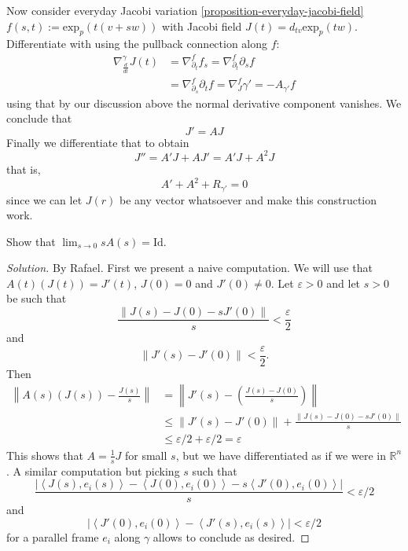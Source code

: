 Now consider everyday Jacobi variation
\ref{proposition-everyday-jacobi-field}
 $f(s,t):=\text{exp}_p(t(v+sw))$ with Jacobi
 field
$J(t)=d_{tv}\text{exp}_p(tw)$. Differentiate
with using the pullback connection
along $f$:
$$
\begin{aligned}
\nabla_{\frac{d}{dt}}^\gamma
J(t)&=\nabla_{\partial_t}^ff_s=
\nabla_{\partial_t}^f
\partial_sf\\
&=\nabla_{\partial_s}^f \partial_t
f=\nabla_{J}^f \gamma' = -A_{\gamma'}f
\end{aligned}
$$
using that by our discussion above the normal
derivative component vanishes. We
conclude that
\begin{equation}
\label{equation-jacob-field-deriv-shape}
J'=AJ
\end{equation}
Finally we differentiate that to obtain
$$
J''=A'J+AJ'=A'J+A^2J
$$
that is,
\begin{equation}
\label{equation-Riccati}
A'+A^2+R_{\gamma'}=0
\end{equation}
since we can let $J(r)$ be any vector
whatsoever and make this construction
work.
\begin{exercise}
\label{exercise-limit-of-shape-operator}
Show that $\lim_{s\to0}sA(s)=\text{Id}$.
\end{exercise}

\begin{proof}[Solution]
By Rafael. First we present a naive
computation. We will use that
$A(t)(J(t))=J'(t)$,  $J(0)=0$ and $J'(0)\neq
0$. Let $\varepsilon>0$ and let
$s>0$ be such that
$$
\frac{\|J(s)-J(0)-sJ'(0)\|}{s}
<\frac{\varepsilon}{2}
$$
and
$$
\|J'(s)-J'(0)\|<\frac{\varepsilon}{2}.
$$
Then
$$
\begin{aligned}
\left\|A(s)(J(s))-\frac{J(s)}{s}\right\|&
=\left\|J'(s)-\left(\frac{J(s)-J(0)}{s}
\right)\right\|\\
&\leq
\|J'(s)-J'(0)\|+\frac{\|J(s)-J(0)-sJ'(0)\|}
{s}\\
&\leq\varepsilon/2+\varepsilon/2=\varepsilon
\end{aligned}
$$
This shows that $A=\frac{1}{s}J$ for small
$s$, but we have differentiated as if
we were in $\mathbb{R}^n$. A similar
computation but picking $s$ such that
$$
\frac{|\left\langle{}J(s),e_i(s)\right\rangle{}-\left\langle{}J(0),
e_i(0)\right\rangle{}
-s\left\langle{}J'(0),e_i(0)\right\rangle{}|}{s}<\varepsilon/
2
$$
and
$$
|\left\langle{}J'(0),e_i(0)\right\rangle{}-\left\langle{}J'(s),e_i(s)
\right\rangle{}|<\varepsilon/2
$$
for a parallel frame $e_i$ along $\gamma$
allows to conclude as desired.
\end{proof}

